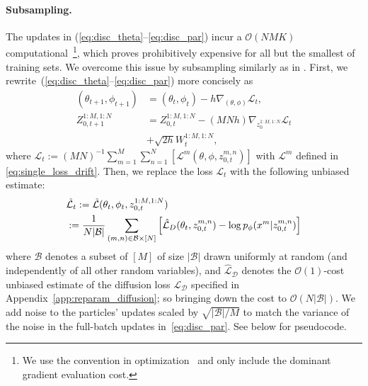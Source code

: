 \documentclass[twoside]{article}
\begin{document}
\paragraph{Subsampling.} The updates  in (\ref{eq:disc_theta}--\ref{eq:disc_par}) incur a $\mathcal{O}(NMK)$ computational~\footnote{We use the convention in optimization~\citep{Nesterov2004} and only include the dominant gradient evaluation cost.}, which proves prohibitively expensive for all but the smallest of training sets. We overcome this issue by subsampling similarly as in \citet{sgld2011,hodenoisingdiffusionprobabilistic2020}. First, we rewrite~(\ref{eq:disc_theta}--\ref{eq:disc_par}) more concisely as
\begin{align*}
    (\theta_{t+1},\phi_{t+1})&=(\theta_t,\phi_t)-h\nabla_{(\theta,\phi)} \mathcal{L}_t,\\
    Z_{0,t+1}^{1:M,1:N}&=Z_{0,t}^{1:M,1:N}- (MNh)\nabla_{z_0^{1:M,1:N}} \mathcal{L}_t\\
    &+\sqrt{{2h}}W_t^{1:M,1:N},
\end{align*}
where $\mathcal{L}_t:=(MN)^{-1}\sum_{m=1}^M\sum_{n=1}^N\left[\mathcal{L}^m(\theta, \phi, z_{0,t}^{m,n})\right]$ with $\mathcal{L}^m$ defined in \eqref{eq:single_loss_drift}. Then, we replace the loss $\mathcal{L}_t$ with the following unbiased estimate:
\begin{align}
    &\hat{\mathcal{L}}_t := \hat{\mathcal{L}}(\theta_t,\phi_t,z^{1:M,1:N}_{0,t})\label{eq:batch_loss}\\
    &:= \frac{1}{N |\mathcal{B}|} \sum_{(m,n)\in \mathcal{B} \times [N]} \left[
    \hat{\mathcal{L}}_D(\theta_t, z_{0,t}^{m,n}) - \log p_\phi ( x^m | z_{0,t}^{m,n}) \right] \notag
\end{align}
where $\mathcal{B}$ denotes a subset of $[M]$ of size $|\mathcal{B}|$ drawn uniformly at random (and independently of all other random variables), and $\hat{\mathcal{L}}_{\mathcal{D}}$ denotes the $\mathcal{O}(1)$-cost unbiased estimate of the diffusion loss $\mathcal{L}_{\mathcal{D}}$ specified in Appendix~\ref{app:reparam_diffusion}; so bringing down the cost to $\mathcal{O}(N|\mathcal{B}|)$. We add noise to the particles' updates scaled by $\sqrt{|\mathcal{B}|/M}$ to match the variance of the noise in the full-batch updates in~\eqref{eq:disc_par}. See  below for pseudocode.
\end{document}

